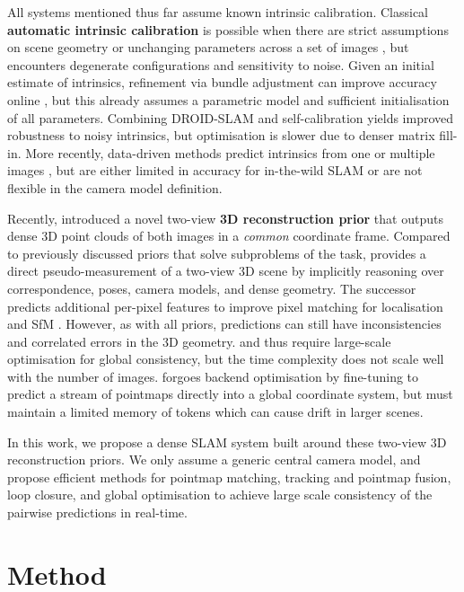 \documentclass[10pt,twocolumn,letterpaper]{article}
\begin{document}
All systems mentioned thus far assume known intrinsic calibration. Classical \textbf{automatic intrinsic calibration} is possible when there are strict assumptions on scene geometry or unchanging parameters across a set of images \cite{hartley2003multiple}, but encounters degenerate configurations and sensitivity to noise.  Given an initial estimate of intrinsics, refinement via bundle adjustment can improve accuracy online \cite{nima_constant_2014}, but this already assumes a parametric model and sufficient initialisation of all parameters.  Combining DROID-SLAM and self-calibration \cite{hagemann2023deep} yields improved robustness to noisy intrinsics, but optimisation is slower due to denser matrix fill-in.  More recently, data-driven methods predict intrinsics from one or multiple images \cite{jin2023perspective, veicht2024geocalib}, but are either limited in accuracy for in-the-wild SLAM or are not flexible in the camera model definition.

Recently, \duster introduced a novel two-view \textbf{3D \nobreak reconstruction prior} that outputs dense 3D point clouds of both images in a \textit{common} coordinate frame.  Compared to previously discussed priors that solve subproblems of the task, \duster provides a direct pseudo-measurement of a two-view 3D scene by implicitly reasoning over correspondence, poses, camera models, and dense geometry.  The successor \master \cite{leroy_mast3r_eccv24} predicts additional per-pixel features to improve pixel matching for localisation and SfM \cite{duisterhof_2024_mast3rsfm}.  However, as with all priors, predictions can still have inconsistencies and correlated errors in the 3D geometry. \duster and \mastersfm thus require large-scale optimisation for global consistency, but the time complexity does not scale well with the number of images.  \spanner \cite{wang2024spann3r} forgoes backend optimisation by fine-tuning \duster to predict a stream of pointmaps directly into a global coordinate system, but must maintain a limited memory of tokens which can cause drift in larger scenes.

In this work, we propose a dense SLAM system built around these two-view 3D reconstruction priors.  We only assume a generic central camera model, and propose efficient methods for pointmap matching, tracking and pointmap fusion, loop closure, and global optimisation to achieve large scale consistency of the pairwise predictions in real-time.

\section{Method}
\label{sec:method}
\end{document}
